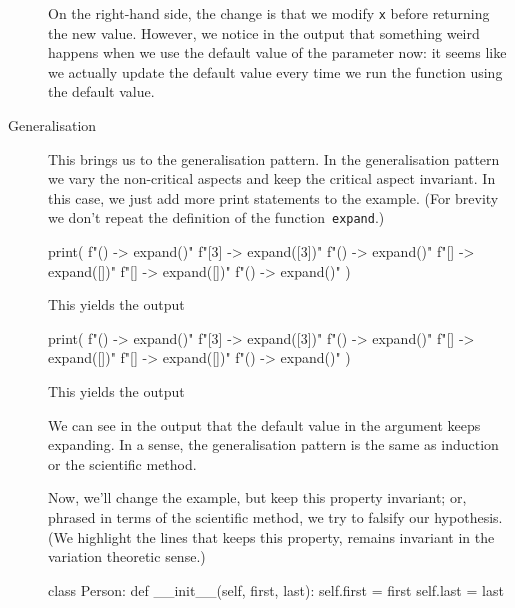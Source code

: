 \begin{description}
    On the right-hand side, the change is that we modify \texttt{x} 
    before returning the new value.
    However, we notice in the output that something weird happens when we use 
    the default value of the parameter now:
    it seems like we actually update the default value every time we run the 
    function using the default value.

  \item[Generalisation] This brings us to the generalisation pattern.
    In the generalisation pattern we vary the non-critical aspects and keep the 
    critical aspect invariant.
    In this case, we just add more print statements to the example.
    (For brevity we don't repeat the definition of the 
    function~\texttt{expand}.)

    \begin{minipage}[t]{0.45\columnwidth}
      \begin{pyblock}[default1]
print(
  f"()  -> {expand()}\n"
  f"[3] -> {expand([3])}\n"
  f"()  -> {expand()}\n"
  f"[]  -> {expand([])}\n"
  f"[]  -> {expand([])}\n"
  f"()  -> {expand()}\n"
)
      \end{pyblock}
      This yields the output
      \printpythontex[verbatim]
    \end{minipage}
    \hfill
    \begin{minipage}[t]{0.45\columnwidth}
      \begin{pyblock}[default2]
print(
  f"()  -> {expand()}\n"
  f"[3] -> {expand([3])}\n"
  f"()  -> {expand()}\n"
  f"[]  -> {expand([])}\n"
  f"[]  -> {expand([])}\n"
  f"()  -> {expand()}\n"
)
      \end{pyblock}
      This yields the output
      \printpythontex[verbatim][highlightlines={1,3,6}]
    \end{minipage}

    We can see in the output that the default value in the argument keeps 
    expanding.
    In a sense, the generalisation pattern is the same as induction or the 
    scientific method.

    Now, we'll change the example, but keep this property invariant;
    or, phrased in terms of the scientific method, we try to falsify our 
    hypothesis.
    (We highlight the lines that keeps this property, \ie remains invariant in 
    the variation theoretic sense.)
    \begin{pyblock}[default1][highlightlines={10-12}]
class Person:
  def __init__(self, first, last):
    self.first = first
    self.last = last


\end{pyblock}
\end{description}

